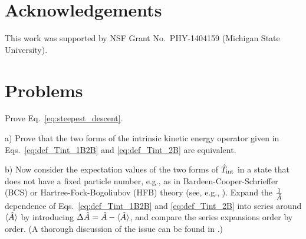 \section{Acknowledgements}
This work was supported by NSF Grant No.~PHY-1404159 (Michigan State University).


\section{Problems}
\begin{prob}\label{problem:steepest_descent}
  Prove Eq.~\eqref{eq:steepest_descent}.
\end{prob}

\begin{prob}\label{problem:tint}
  \item[a)] Prove that the two forms of the intrinsic kinetic energy operator given in 
  Eqs.~\eqref{eq:def_Tint_1B2B} and \eqref{eq:def_Tint_2B} are equivalent.

  \item[b)] Now consider the expectation values of the two forms of $\hat{T}_\text{int}$
  in a state that does not have a fixed particle number, e.g., as in 
  Bardeen-Cooper-Schrieffer (BCS) \cite{Bardeen:1957bz,Bardeen:1957tv}
  or Hartree-Fock-Bogoliubov (HFB) theory (see, e.g., \cite{Ring:1980bb}). Expand
  the $\frac{1}{\hat{A}}$ dependence of Eqs.~\eqref{eq:def_Tint_1B2B} and \eqref{eq:def_Tint_2B} 
  into series around $\langle{\ensuremath{\hat{A}}}\rangle$ by introducing $\Delta\hat{A}=\hat{A}-\langle{\ensuremath{\hat{A}}}\rangle$, 
  and compare the series expansions order by order.
  (A thorough discussion of the issue can be found in \cite{Hergert:2009wh}.)

\end{prob}

